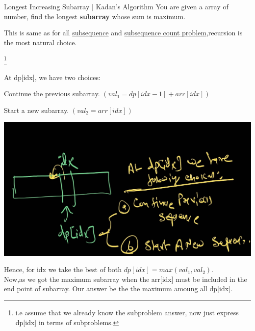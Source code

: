 
\begin{problem}[Question:]{Longest Increasing Subarray | Kadan's Algorithm}
    You are given a array of number, find the longest \textbf{subarray} whose sum is maximum.

\end{problem}

\begin{solution}
    This is same as for all \underline{subsequence} and \underline{subsequence count problem},recursion is the most natural choice.

    \medskip
    \footnote{i.e assume that we already know the subproblem answer, now just express dp[idx] in terms of subproblems.}
    
    \medskip
    At dp[idx], we have two choices:
    \begin{asparaenum}[(a)]
        \item \indent Continue the previous subarray. $(val_1 = dp[idx-1]+arr[idx])$
        \item Start a new subarray. $(val_2 = arr[idx])$
    \end{asparaenum}

    \begin{marginfigure}
        \includegraphics[width=\marginparwidth]{./resources/KadansChoices.jpg}
    \end{marginfigure}

    \medskip
    Hence, for idx we take the best of both $dp[idx] = max(val_1,val_2)$. \\[2mm]
    Now,as we got the maximum subarray when the arr[idx] must be included in the end point of subarray. Our answer be the the maximum amoung all dp[idx].


\end{solution}
